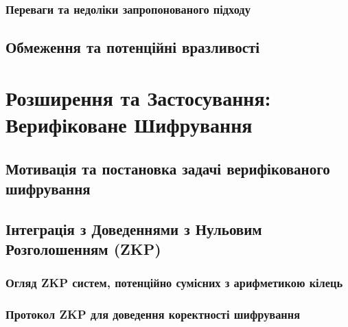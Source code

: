 \documentclass[a4paper,12pt]{article}
\begin{document}
    \subsubsection{Переваги та недоліки запропонованого підходу} %

    \subsection{Обмеження та потенційні вразливості} %

    \newpage


    \section{Розширення та Застосування: Верифіковане Шифрування} %

    \subsection{Мотивація та постановка задачі верифікованого шифрування} %

    \subsection{Інтеграція з Доведеннями з Нульовим Розголошенням (ZKP)} %

    \subsubsection{Огляд ZKP систем, потенційно сумісних з арифметикою кілець} %

    \subsubsection{Протокол ZKP для доведення коректності шифрування} %
\end{document}
